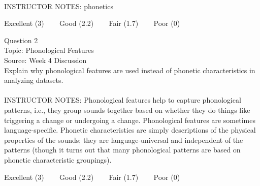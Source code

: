 \documentclass[12pt]{article}
\begin{document}
~\\
INSTRUCTOR NOTES: phonetics


\vfill
Excellent (3) ~~~ Good (2.2) ~~~ Fair (1.7) ~~~ Poor (0)
\newpage

{\large Question 2}\\

Topic: Phonological Features\\
Source: Week 4 Discussion\\

Explain why phonological features are used instead of phonetic characteristics in analyzing datasets.\\


~\\
INSTRUCTOR NOTES: Phonological features help to capture phonological patterns, i.e., they group sounds together based on whether they do things like triggering a change or undergoing a change. Phonological features are sometimes language-specific. Phonetic characteristics are simply descriptions of the physical properties of the sounds; they are language-universal and independent of the patterns (though it turns out that many phonological patterns are based on phonetic characteristic groupings).


\vfill
Excellent (3) ~~~ Good (2.2) ~~~ Fair (1.7) ~~~ Poor (0)
\newpage

\begin{center}
\textbf{{\color{red}{\HUGE END OF EXAM}}}\\

\end{center}
\newpage
\end{document}
